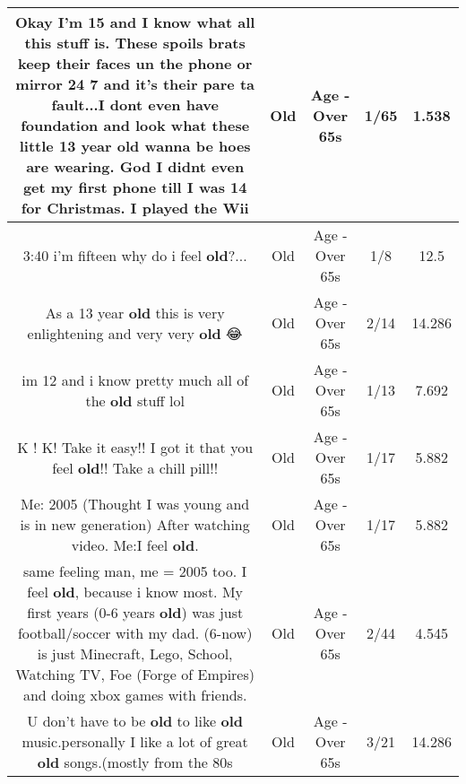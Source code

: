 \documentclass[11pt]{article}
\newlength\mylength
\begin{document}
\begin{center}
\begin{longtable}{|C{.65\mylength}|C{.30\mylength}|C{.12\mylength}|C{.12\mylength}|C{.12\mylength}|}
  \small Okay I'm 15 and I know what all this stuff is. These spoils brats keep their faces un the phone or mirror 24 7 and it's their pare ta fault...I dont even have foundation and look what these little 13 year \textbf{old} wanna be hoes are wearing. God I didnt even get my first phone till I was 14 for Christmas. I played the Wii\normalsize   & Old & Age - Over 65s & 1/65 & 1.538 \\  \hline
  \small 3:40 i'm fifteen why do i feel \textbf{old}?...\normalsize   & Old & Age - Over 65s & 1/8 & 12.5 \\  \hline
  \small As a 13 year \textbf{old} this is very enlightening and very very \textbf{old} 😂\normalsize   & Old & Age - Over 65s & 2/14 & 14.286 \\  \hline
  \small im 12 and i know pretty much all of the \textbf{old} stuff lol\normalsize   & Old & Age - Over 65s & 1/13 & 7.692 \\  \hline
  \small K ! K! Take it easy!! I got it that you feel \textbf{old}!! Take a chill pill!!\normalsize   & Old & Age - Over 65s & 1/17 & 5.882 \\  \hline
  \small Me: 2005 (Thought I was young and is in new generation) After watching video. Me:I feel \textbf{old}.\normalsize   & Old & Age - Over 65s & 1/17 & 5.882 \\  \hline
  \small same feeling man, me = 2005 too. I feel \textbf{old}, because i know most. My first years (0-6 years \textbf{old}) was just football/soccer with my dad. (6-now) is just Minecraft, Lego, School, Watching TV, Foe (Forge of Empires) and doing xbox games with friends.\normalsize   & Old & Age - Over 65s & 2/44 & 4.545 \\  \hline
  \small U don't have to be \textbf{old} to like \textbf{old} music.personally I like a lot of great \textbf{old} songs.(mostly from the 80s\normalsize   & Old & Age - Over 65s & 3/21 & 14.286 \\  \hline

\end{longtable}
\end{center}
\end{document}
